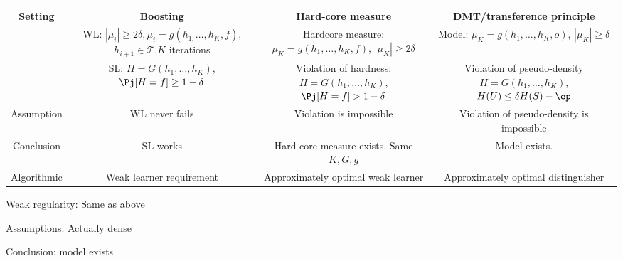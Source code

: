 \begin{tabular}{|c|c|c|c|}
\hline 
Setting & Boosting & Hard-core measure & DMT/transference principle\tabularnewline
\hline 
\hline 
 & WL: $|\mu_{i}|\ge2\delta,\mu_{i}=g(h_{1,}\ldots,h_{K},f)$,$h_{i+1}\in\mathcal{T}$,$K$
iterations & Hardcore measure: $\mu_{K}=g(h_{1},\ldots,h_{K},f)$, $|\mu_{K}|\ge2\delta$ & Model: $\mu_{K}=g(h_{1},\ldots,h_{K},o)$, $|\mu_{K}|\ge\delta$\tabularnewline
\hline 
 & SL: $H=G(h_{1},\ldots,h_{K})$,$\Pj[H=f]\ge1-\delta$ & Violation of hardness: $H=G(h_{1},\ldots,h_{K})$, $\Pj[H=f]>1-\delta$ & Violation of pseudo-density $H=G(h_{1},\ldots,h_{K})$, $H(U)\le\delta H(S)-\ep$\tabularnewline
\hline 
Assumption & WL never fails & Violation is impossible & Violation of pseudo-density is impossible\tabularnewline
\hline 
Conclusion & SL works & Hard-core measure exists. Same $K,G,g$ & Model exists. \tabularnewline
\hline 
Algorithmic & Weak learner requirement & Approximately optimal weak learner & Approximately optimal distinguisher\tabularnewline
\hline 
\end{tabular}

Weak regularity: Same as above

Assumptions: Actually dense

Conclusion: model exists


